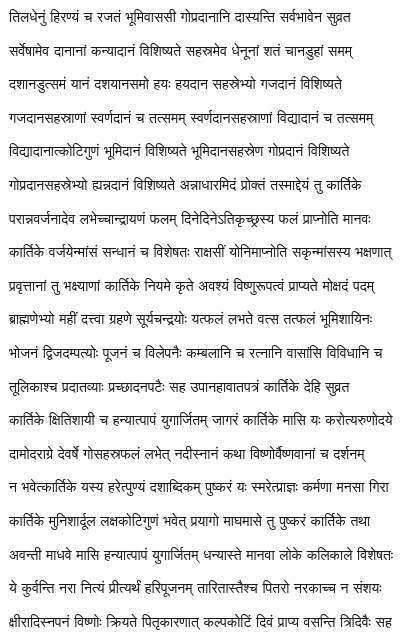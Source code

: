 \twolineshloka
{तिलधेनुं हिरण्यं च रजतं भूमिवाससी}
{गोप्रदानानि दास्यन्ति सर्वभावेन सुव्रत} %

\twolineshloka
{सर्वेषामेव दानानां कन्यादानं विशिष्यते}
{सहस्रमेव धेनूनां शतं चानडुहां समम्} %

\twolineshloka
{दशानडुत्समं यानं दशयानसमो हयः}
{हयदान सहस्रेभ्यो गजदानं विशिष्यते} %

\twolineshloka
{गजदानसहस्राणां स्वर्णदानं च तत्समम्}
{स्वर्णदानसहस्राणां विद्यादानं च तत्समम्} %

\twolineshloka
{विद्यादानात्कोटिगुणं भूमिदानं विशिष्यते}
{भूमिदानसहस्रेण गोप्रदानं विशिष्यते} %

\twolineshloka
{गोप्रदानसहस्रेभ्यो ह्यन्नदानं विशिष्यते}
{अन्नाधारमिदं प्रोक्तं तस्माद्देयं तु कार्तिके} %

\twolineshloka
{परान्नवर्जनादेव लभेच्चान्द्रायणं फलम्}
{दिनेदिनेऽतिकृच्छ्रस्य फलं प्राप्नोति मानवः} %

\twolineshloka
{कार्तिके वर्जयेन्मांसं सन्धानं च विशेषतः}
{राक्षसीं योनिमाप्नोति सकृन्मांसस्य भक्षणात्} %

\twolineshloka
{प्रवृत्तानां तु भक्ष्याणां कार्तिके नियमे कृते}
{अवश्यं विष्णुरूपत्वं प्राप्यते मोक्षदं पदम्} %

\twolineshloka
{ब्राह्मणेभ्यो महीं दत्त्वा ग्रहणे सूर्यचन्द्रयोः}
{यत्फलं लभते वत्स तत्फलं भूमिशायिनः} %

\twolineshloka
{भोजनं द्विजदम्पत्योः पूजनं च विलेपनैः}
{कम्बलानि च रत्नानि वासांसि विविधानि च} %

\twolineshloka
{तूलिकाश्च प्रदातव्याः प्रच्छादनपटैः सह}
{उपानहावातपत्रं कार्तिके देहि सुव्रत} %

\twolineshloka
{कार्तिके क्षितिशायी च हन्यात्पापं युगार्जितम्}
{जागरं कार्तिके मासि यः करोत्यरुणोदये} %

\twolineshloka
{दामोदराग्रे देवर्षे गोसहस्रफलं लभेत्}
{नदीस्नानं कथा विष्णोर्वैष्णवानां च दर्शनम्} %

\twolineshloka
{न भवेत्कार्तिके यस्य हरेत्पुण्यं दशाब्दिकम्}
{पुष्करं यः स्मरेत्प्राज्ञः कर्मणा मनसा गिरा} %

\twolineshloka
{कार्तिके मुनिशार्दूल लक्षकोटिगुणं भवेत्}
{प्रयागो माघमासे तु पुष्करं कार्तिके तथा} %

\twolineshloka
{अवन्ती माधवे मासि हन्यात्पापं युगार्जितम्}
{धन्यास्ते मानवा लोके कलिकाले विशेषतः} %

\twolineshloka
{ये कुर्वन्ति नरा नित्यं प्रीत्यर्थं हरिपूजनम्}
{तारितास्तैश्च पितरो नरकाच्च न संशयः} %

\twolineshloka
{क्षीरादिस्नपनं विष्णोः क्रियते पितृकारणात्}
{कल्पकोटिं दिवं प्राप्य वसन्ति त्रिदिवैः सह} %

